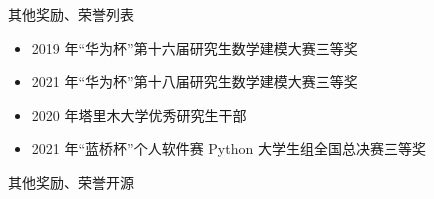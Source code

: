\documentclass[xcolor=svgnames, t, aspectratio=169]{ctexbeamer}
\begin{document}
\begin{frame}{其他奖励、荣誉}{列表}
  \begin{itemize}
    \item 2019 年“华为杯”第十六届研究生数学建模大赛三等奖
    \item 2021 年“华为杯”第十八届研究生数学建模大赛三等奖
    \item 2020 年塔里木大学优秀研究生干部
    \item 2021 年“蓝桥杯”个人软件赛 Python 大学生组全国总决赛三等奖
  \end{itemize}
\end{frame}
\begin{frame}{其他奖励、荣誉}{开源}
  \begin{center}
  \end{center}
\end{frame}
{\taruwavesbg
\begin{frame}
\end{frame}
}
\end{document}
